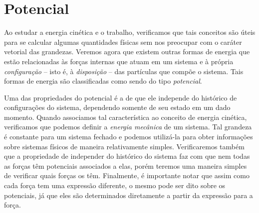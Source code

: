 \section{Potencial}

Ao estudar a energia cinética e o trabalho, verificamos que tais conceitos são úteis para se calcular algumas quantidades físicas sem nos preocupar com o caráter vetorial das grandezas. Veremos agora que existem outras formas de energia que estão relacionadas às forças internas que atuam em um sistema e à própria \emph{configuração} -- isto é, à \emph{disposição} -- das partículas que compõe o sistema. Tais formas de energia são classificadas como sendo do tipo \emph{potencial}.

Uma das propriedades do potencial é a de que ele independe do histórico de configurações do sistema, dependendo somente de seu estado em um dado momento. Quando associamos tal característica ao conceito de energia cinética, verificamos que podemos definir a \emph{energia mecânica} de um sistema. Tal grandeza é constante para um sistema fechado e podemos utilizá-la para obter informações sobre sistemas físicos de maneira relativamente simples. Verificaremos também que a propriedade de independer do histórico do sistema faz com que nem todas as forças têm potenciais associados a elas, porém teremos uma maneira simples de verificar quais forças os têm. Finalmente, é importante notar que assim como cada força tem uma expressão diferente, o mesmo pode ser dito sobre os potenciais, já que eles são determinados diretamente a partir da expressão para a força.


